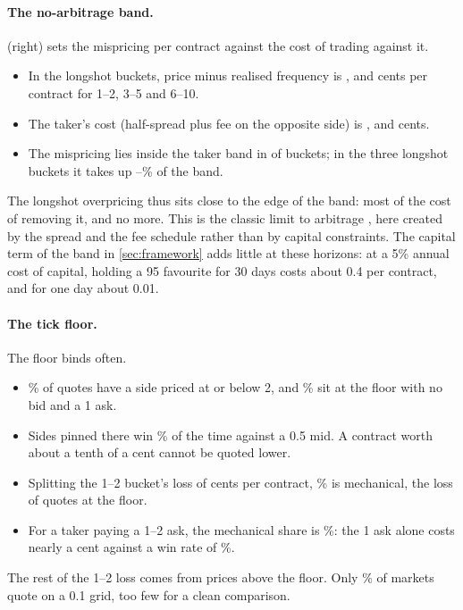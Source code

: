\paragraph{The no-arbitrage band.}
 (right) sets the mispricing per contract against the cost of trading against it.
\begin{itemize}
\item In the longshot buckets, price minus realised frequency is \xsBandBOneMis, \xsBandBThreeMis{}
      and \xsBandBSixMis{} cents per contract for 1--2, 3--5 and 6--10\cents.
\item The taker's cost (half-spread plus fee on the opposite side) is \xsBandBOneCost,
      \xsBandBThreeCost{} and \xsBandBSixCost{} cents.
\item The mispricing lies inside the taker band in \xsBandInside{} of \xsBandN{} buckets; in the three
      longshot buckets it takes up \xsBandShareMin--\xsBandShareMax\% of the band.
\end{itemize}
The longshot overpricing thus sits close to the edge of the band: most of the cost of removing it,
and no more. This is the classic limit to arbitrage \citep{shleifervishny1997}, here
created by the spread and the fee schedule rather than by capital constraints. The capital term of
the band in \cref{sec:framework} adds little at these horizons: at a 5\%
annual cost of capital, holding a 95\cents{} favourite for 30 days costs about 0.4\cents{} per
contract, and for one day about 0.01\cents.

\paragraph{The tick floor.}
The floor binds often.
\begin{itemize}
\item \xsFloorShareEither\% of quotes have a side priced at or below 2\cents, and \xsFloorSharePinned\%
      sit at the floor with no bid and a 1\cents{} ask.
\item Sides pinned there win \xsFloorPinnedWin\% of the time against a 0.5\cents{} mid. A contract worth
      about a tenth of a cent cannot be quoted lower.
\item Splitting the 1--2\cents{} bucket's loss of \xsFloorAllLoss{} cents per contract,
      \xsFloorAllMechShare\% is mechanical, the loss of quotes at the floor.
\item For a taker paying a 1--2\cents{} ask, the mechanical share is \xsFloorTakerMechShare\%: the
      1\cents{} ask alone costs nearly a cent against a win rate of \xsFloorTakerWin\%.
\end{itemize}
The rest of the 1--2\cents{} loss comes from prices above the floor. Only \xsSubcentShare\% of
markets quote on a 0.1\cents{} grid, too few for a clean comparison.

